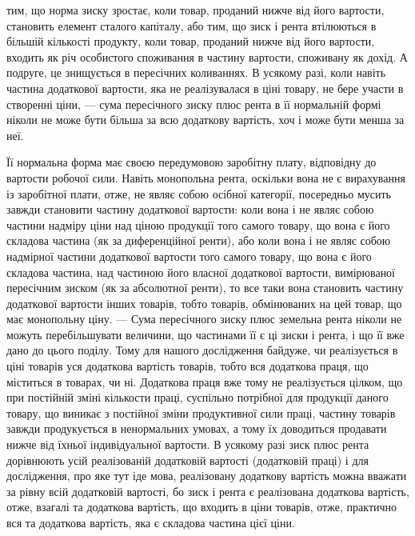 \parcont{}  %
тим, що норма зиску зростає, коли товар, проданий нижче від його вартости,
становить елемент сталого капіталу, або тим, що зиск і рента втілюються
в більшій кількості продукту, коли товар, проданий нижче від його вартости,
входить як річ особистого споживання в частину вартости, споживану як дохід.
А подруге, це знищується в пересічних коливаннях. В усякому разі, коли навіть
частина додаткової вартости, яка не реалізувалася в ціні товару, не бере участи
в створенні ціни, — сума пересічного зиску плюс рента в її нормальній формі
ніколи не може бути більша за всю додаткову вартість, хоч і може бути
менша за неї.

Її нормальна форма має своєю передумовою заробітну плату, відповідну
до вартости робочої сили. Навіть монопольна рента, оскільки вона не є вирахування
із заробітної плати, отже, не являє собою осібної категорії, посередньо
мусить завжди становити частину додаткової вартости: коли вона і не являє
собою частини надміру ціни над ціною продукції того самого товару, що вона
є його складова частина (як за диференційної ренти), або коли вона і не являє
собою надмірної частини додаткової вартости того самого товару, що вона є його
складова частина, над частиною його власної додаткової вартости, вимірюваної
пересічним зиском (як за абсолютної ренти), то все таки вона становить частину
додаткової вартости інших товарів, тобто товарів, обмінюваних на цей товар,
що має монопольну ціну. — Сума пересічного зиску плюс земельна рента ніколи
не можуть перебільшувати величини, що частинами її є ці зиски і рента, і що її
вже дано до цього поділу. Тому для нашого дослідження байдуже, чи реалізується
в ціні товарів уся додаткова вартість товарів, тобто вся додаткова праця,
що міститься в товарах, чи ні. Додаткова праця вже тому не реалізується цілком,
що при постійній зміні кількости праці, суспільно потрібної для продукції даного
товару, що виникає з постійної зміни продуктивної сили праці, частину
товарів завжди продукується в ненормальних умовах, а тому їх доводиться
продавати нижче від їхньої індивідуальної вартости. В усякому разі зиск
плюс рента дорівнюють усій реалізованій додатковій вартості (додатковій праці)
і для дослідження, про яке тут іде мова, реалізовану додаткову вартість можна
вважати за рівну всій додатковій вартості, бо зиск і рента є реалізована додаткова
вартість, отже, взагалі та додаткова вартість, що входить в ціни товарів,
отже, практично вся та додаткова вартість, яка є складова частина цієї ціни.

